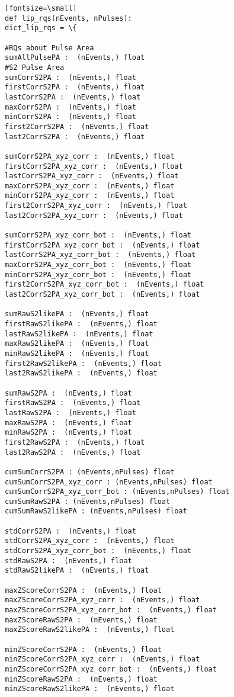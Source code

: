 \begin{verbatim}[fontsize=\small]
def lip_rqs(nEvents, nPulses):
dict_lip_rqs = \{

#RQs about Pulse Area
sumAllPulsePA :  (nEvents,) float
#S2 Pulse Area
sumCorrS2PA :  (nEvents,) float 
firstCorrS2PA :  (nEvents,) float
lastCorrS2PA :  (nEvents,) float
maxCorrS2PA :  (nEvents,) float
minCorrS2PA :  (nEvents,) float
first2CorrS2PA :  (nEvents,) float
last2CorrS2PA :  (nEvents,) float

sumCorrS2PA_xyz_corr :  (nEvents,) float 
firstCorrS2PA_xyz_corr :  (nEvents,) float
lastCorrS2PA_xyz_corr :  (nEvents,) float
maxCorrS2PA_xyz_corr :  (nEvents,) float
minCorrS2PA_xyz_corr :  (nEvents,) float
first2CorrS2PA_xyz_corr :  (nEvents,) float
last2CorrS2PA_xyz_corr :  (nEvents,) float

sumCorrS2PA_xyz_corr_bot :  (nEvents,) float 
firstCorrS2PA_xyz_corr_bot :  (nEvents,) float
lastCorrS2PA_xyz_corr_bot :  (nEvents,) float
maxCorrS2PA_xyz_corr_bot :  (nEvents,) float
minCorrS2PA_xyz_corr_bot :  (nEvents,) float
first2CorrS2PA_xyz_corr_bot :  (nEvents,) float
last2CorrS2PA_xyz_corr_bot :  (nEvents,) float

sumRawS2likePA :  (nEvents,) float 
firstRawS2likePA :  (nEvents,) float
lastRawS2likePA :  (nEvents,) float
maxRawS2likePA :  (nEvents,) float
minRawS2likePA :  (nEvents,) float
first2RawS2likePA :  (nEvents,) float
last2RawS2likePA :  (nEvents,) float

sumRawS2PA :  (nEvents,) float 
firstRawS2PA :  (nEvents,) float
lastRawS2PA :  (nEvents,) float
maxRawS2PA :  (nEvents,) float
minRawS2PA :  (nEvents,) float
first2RawS2PA :  (nEvents,) float
last2RawS2PA :  (nEvents,) float

cumSumCorrS2PA : (nEvents,nPulses) float
cumSumCorrS2PA_xyz_corr : (nEvents,nPulses) float
cumSumCorrS2PA_xyz_corr_bot : (nEvents,nPulses) float
cumSumRawS2PA : (nEvents,nPulses) float
cumSumRawS2likePA : (nEvents,nPulses) float

stdCorrS2PA :  (nEvents,) float
stdCorrS2PA_xyz_corr :  (nEvents,) float
stdCorrS2PA_xyz_corr_bot :  (nEvents,) float
stdRawS2PA :  (nEvents,) float
stdRawS2likePA :  (nEvents,) float

maxZScoreCorrS2PA :  (nEvents,) float
maxZScoreCorrS2PA_xyz_corr :  (nEvents,) float
maxZScoreCorrS2PA_xyz_corr_bot :  (nEvents,) float
maxZScoreRawS2PA :  (nEvents,) float
maxZScoreRawS2likePA :  (nEvents,) float

minZScoreCorrS2PA :  (nEvents,) float
minZScoreCorrS2PA_xyz_corr :  (nEvents,) float
minZScoreCorrS2PA_xyz_corr_bot :  (nEvents,) float
minZScoreRawS2PA :  (nEvents,) float
minZScoreRawS2likePA :  (nEvents,) float


\end{verbatim}
